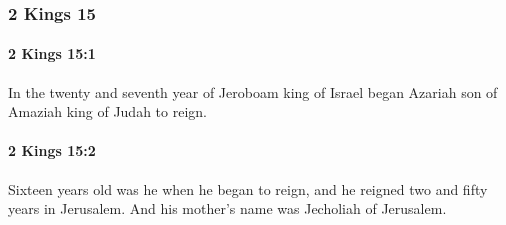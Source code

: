 	\subsubsection{2 Kings 15} %
		\label{2KINGS-15}

		\paragraph{2 Kings 15:1} %
			\label{2KINGS-15-1}

			In the twenty and seventh year of Jeroboam king of Israel began Azariah son of Amaziah king of Judah to reign.


		\paragraph{2 Kings 15:2} %
			\label{2KINGS-15-2}

			Sixteen years old was he when he began to reign, and he reigned two and fifty years in Jerusalem. And his mother’s name was Jecholiah of Jerusalem.

